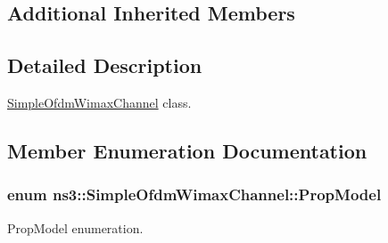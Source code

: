 \subsection*{Additional Inherited Members}


\subsection{Detailed Description}
\hyperlink{classns3_1_1SimpleOfdmWimaxChannel}{Simple\+Ofdm\+Wimax\+Channel} class. 

\subsection{Member Enumeration Documentation}
\subsubsection[{\texorpdfstring{Prop\+Model}{PropModel}}]{\setlength{\rightskip}{0pt plus 5cm}enum {\bf ns3\+::\+Simple\+Ofdm\+Wimax\+Channel\+::\+Prop\+Model}}\hypertarget{classns3_1_1SimpleOfdmWimaxChannel_ad8299e6adf4848b1cf213df963e94842}{}\label{classns3_1_1SimpleOfdmWimaxChannel_ad8299e6adf4848b1cf213df963e94842}


Prop\+Model enumeration. 


